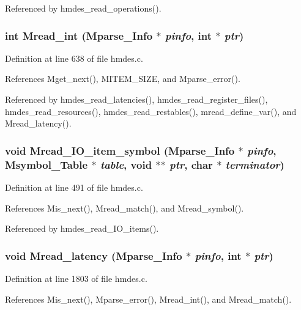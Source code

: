 Referenced by hmdes\_\-read\_\-operations().
\subsubsection{\setlength{\rightskip}{0pt plus 5cm}int Mread\_\-int (\bf{Mparse\_\-Info} $\ast$ {\em pinfo}, int $\ast$ {\em ptr})}\label{hmdes_8c_21167fd2307af816d91d77546db04321}




Definition at line 638 of file hmdes.c.

References Mget\_\-next(), MITEM\_\-SIZE, and Mparse\_\-error().

Referenced by hmdes\_\-read\_\-latencies(), hmdes\_\-read\_\-register\_\-files(), hmdes\_\-read\_\-resources(), hmdes\_\-read\_\-restables(), mread\_\-define\_\-var(), and Mread\_\-latency().
\subsubsection{\setlength{\rightskip}{0pt plus 5cm}void Mread\_\-IO\_\-item\_\-symbol (\bf{Mparse\_\-Info} $\ast$ {\em pinfo}, \bf{Msymbol\_\-Table} $\ast$ {\em table}, void $\ast$$\ast$ {\em ptr}, char $\ast$ {\em terminator})}\label{hmdes_8c_a4ef52a27eef051d7a947f6dfe72b35d}




Definition at line 491 of file hmdes.c.

References Mis\_\-next(), Mread\_\-match(), and Mread\_\-symbol().

Referenced by hmdes\_\-read\_\-IO\_\-items().
\subsubsection{\setlength{\rightskip}{0pt plus 5cm}void Mread\_\-latency (\bf{Mparse\_\-Info} $\ast$ {\em pinfo}, int $\ast$ {\em ptr})}\label{hmdes_8c_22d3dd7a1d22829c6e1ddf7a1b3f51ab}




Definition at line 1803 of file hmdes.c.

References Mis\_\-next(), Mparse\_\-error(), Mread\_\-int(), and Mread\_\-match().

